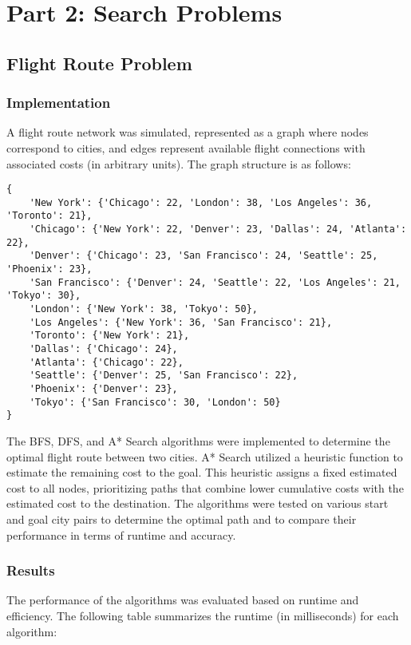 \documentclass[12pt]{article}
\begin{document}
\newpage
\section{Part 2: Search Problems}

\subsection{Flight Route Problem}

\subsubsection{Implementation}

A flight route network was simulated, represented as a graph where nodes correspond to cities, and edges represent available flight connections with associated costs (in arbitrary units). The graph structure is as follows:

\begin{verbatim}
{
    'New York': {'Chicago': 22, 'London': 38, 'Los Angeles': 36, 'Toronto': 21},
    'Chicago': {'New York': 22, 'Denver': 23, 'Dallas': 24, 'Atlanta': 22},
    'Denver': {'Chicago': 23, 'San Francisco': 24, 'Seattle': 25, 'Phoenix': 23},
    'San Francisco': {'Denver': 24, 'Seattle': 22, 'Los Angeles': 21, 'Tokyo': 30},
    'London': {'New York': 38, 'Tokyo': 50},
    'Los Angeles': {'New York': 36, 'San Francisco': 21},
    'Toronto': {'New York': 21},
    'Dallas': {'Chicago': 24},
    'Atlanta': {'Chicago': 22},
    'Seattle': {'Denver': 25, 'San Francisco': 22},
    'Phoenix': {'Denver': 23},
    'Tokyo': {'San Francisco': 30, 'London': 50}
}
\end{verbatim}

The BFS, DFS, and A* Search algorithms were implemented to determine the optimal flight route between two cities. A* Search utilized a heuristic function to estimate the remaining cost to the goal. This heuristic assigns a fixed estimated cost to all nodes, prioritizing paths that combine lower cumulative costs with the estimated cost to the destination. The algorithms were tested on various start and goal city pairs to determine the optimal path and to compare their performance in terms of runtime and accuracy.

\subsubsection{Results}

The performance of the algorithms was evaluated based on runtime and efficiency. The following table summarizes the runtime (in milliseconds) for each algorithm:
\end{document}
